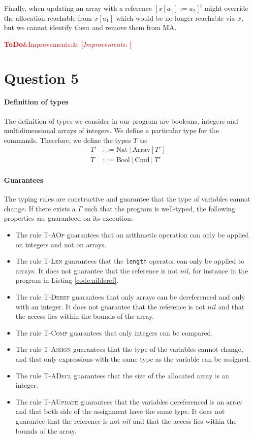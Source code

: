 \documentclass{article}
\newcommand{\todo}[1]{\textcolor{red}{\textbf{ToDo}\ifx&#1&\else ~[\emph{#1} ]~\fi}}
\begin{document}
Finally, when updating an array with a reference \([x[a_1] := a_2]^l\) might override the allocation reachable from \(x[a_1]\) which would be no longer reachable via \(x\), but we cannot identify them and remove them from MA.

\todo{Improvements:}


\section*{Question 5}
\paragraph{Definition of types}
The definition of types we consider in our program are booleans, integers and multidimensional arrays of integers. We define a particular type for the commands. Therefore, we define the types \(T\) as:
\begin{equation*} \label{eq1}
\begin{split}
T' & ::= \text{Nat}\ |\ \text{Array}[T']\\
T  & ::= \text{Bool}\ |\ \text{Cmd}\ |\ T'
\end{split}
\end{equation*}

\paragraph{Guarantees}
The typing rules are constructive and guarantee that the type of variables cannot change.
If there exists a \(\Gamma\) such that the program is well-typed, the following properties are guaranteed on its execution:
\begin{itemize}
 \item The rule \textsc{T-AOp} guarantees that an arithmetic operation can only be applied on integers and not on arrays.
 \item The rule \textsc{T-Len} guarantees that the \texttt{length} operator can only be applied to arrays. It does not guarantee that the reference is not \(nil\), for instance in the program in Listing \ref{code:nilderef}.
 \item The rule \textsc{T-Deref} guarantees that only arrays can be dereferenced and only with an integer. It does not guarantee that the reference is not \(nil\) and that the access lies within the bounds of the array.
 \item The rule \textsc{T-Comp} guarantees that only integers can be compared.
 \item The rule \textsc{T-Assign} guarantees that the type of the variables cannot change, and that only expressions with the same type as the variable can be assigned. 
 \item The rule \textsc{T-ADecl} guarantees that the size of the allocated array is an integer.
 \item The rule \textsc{T-AUpdate} guarantees that the variables dereferenced is an array and that both side of the assignment have the same type. It does not guarantee that the reference is not \(nil\) and that the access lies within the bounds of the array.
\end{itemize}
\end{document}
